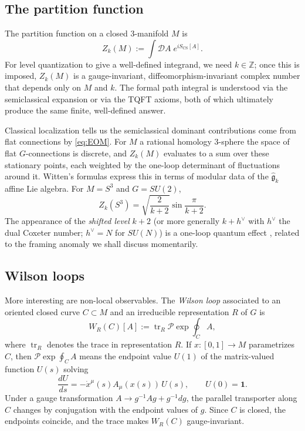 \documentclass[11pt]{article}
\newcommand{\Z}{\mathbb{Z}}
\newcommand{\tr}{\operatorname{tr}}
\newcommand{\CS}{\operatorname{CS}}
\theoremstyle{definition}
\numberwithin{theorem}{section}
\numberwithin{equation}{section}
\begin{document}
\subsection{The partition function}

The partition function on a closed 3-manifold $M$ is
\begin{equation}\label{eq:Z-CS}
Z_k(M) := \int \mathcal{D}A\; e^{iS_{\CS}[A]}.
\end{equation}
For level quantization to give a well-defined integrand, we need $k\in \Z$; once this is imposed, $Z_k(M)$ is a gauge-invariant, diffeomorphism-invariant complex number that depends only on $M$ and $k$. The formal path integral is understood via the semiclassical expansion or via the TQFT axioms, both of which ultimately produce the same finite, well-defined answer.

\medskip

\noindent Classical localization tells us the semiclassical dominant contributions come from flat connections by \eqref{eq:EOM}. For $M$ a rational homology 3-sphere the space of flat $G$-connections is discrete, and $Z_k(M)$ evaluates to a sum over these stationary points, each weighted by the one-loop determinant of fluctuations around it. Witten's formulas \cite{Witten1989Jones} express this in terms of modular data of the $\widehat{\mathfrak{g}}_k$ affine Lie algebra. For $M = S^3$ and $G = SU(2)$,
\begin{equation}\label{eq:Z-S3}
Z_k(S^3) = \sqrt{\frac{2}{k+2}}\sin\frac{\pi}{k+2}.
\end{equation}
The appearance of the \emph{shifted level} $k+2$ (or more generally $k+h^\vee$ with $h^\vee$ the dual Coxeter number; $h^\vee = N$ for $SU(N)$) is a one-loop quantum effect \cite{Witten1989Jones, ElitzurMooreSchwimmerSeiberg1989}, related to the framing anomaly we shall discuss momentarily.

\subsection{Wilson loops}

More interesting are non-local observables. The \emph{Wilson loop} associated to an oriented closed curve $C\subset M$ and an irreducible representation $R$ of $G$ is
\begin{equation}\label{eq:Wilson}
W_R(C)[A] := \tr_R \mathcal{P}\exp\oint_C A,
\end{equation}
where $\tr_R$ denotes the trace in representation $R$. If $x:[0,1]\to M$ parametrizes $C$, then $\mathcal{P}\exp\oint_C A$ means the endpoint value $U(1)$ of the matrix-valued function $U(s)$ solving
\begin{equation*}
\frac{dU}{ds} = -\dot x^\mu(s)A_\mu(x(s))\,U(s),
\qquad
U(0)=\mathbf{1}.
\end{equation*}
Under a gauge transformation $A\to g^{-1}Ag + g^{-1}dg$, the parallel transporter along $C$ changes by conjugation with the endpoint values of $g$. Since $C$ is closed, the endpoints coincide, and the trace makes $W_R(C)$ gauge-invariant.
\end{document}

